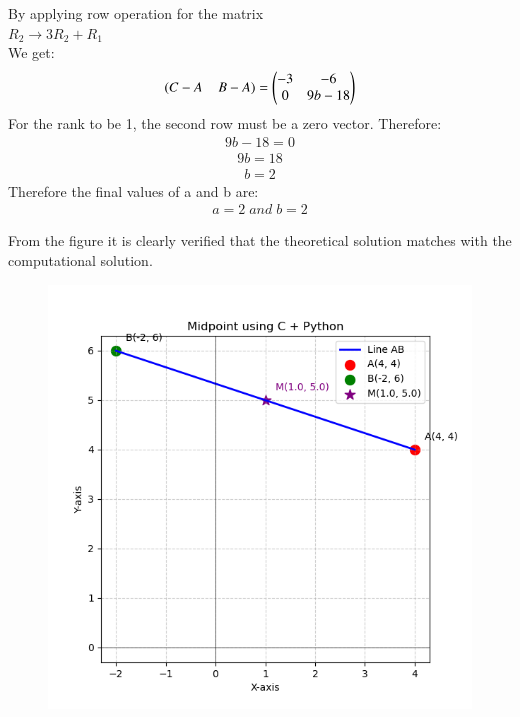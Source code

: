 \documentclass[journal]{IEEEtran}
\theoremstyle{remark}
\begin{document}
By applying row operation for the matrix\\
$R_2\longrightarrow3R_2+R_1$\\
We get:
\begin{align}
   (C-A\;\;\;\;B-A)=\begin{pmatrix}-3&-6\\
   0&9b-18\end{pmatrix}
\end{align}
For the rank to be 1, the second row must be a zero vector. Therefore:
\begin{align}
9b-18=0
\end{align}
\begin{align}
9b=18
\end{align}
\begin{align}
b=2
\end{align}
Therefore the final values of a and b are:
\begin{align}
    a=2\;and\;b=2
\end{align}


From the figure it is clearly verified that the theoretical solution matches with the computational solution.\\
\begin{figure}[h]
    \centering
    \includegraphics[height=0.5\textheight, keepaspectratio]{figs/figure1.png}
    \label{figure_1}
\end{figure}
\end{document}
